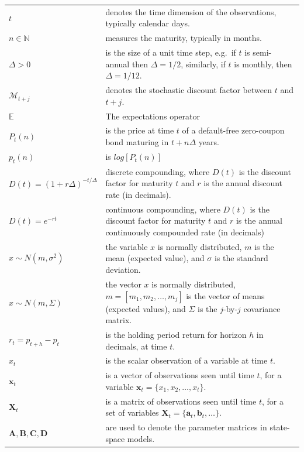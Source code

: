 \documentclass[
  letterpaper,
  DIV=11,
  numbers=noendperiod]{scrreprt}
\newcounter{none} %
\begin{document}
{\def\LTcaptype{none} %
\begin{longtable}[]{@{}ll@{}}
\toprule\noalign{}
\endhead
\bottomrule\noalign{}
\endlastfoot
\(t\) & denotes the time dimension of the observations, typically
calendar days. \\
\(n\in \mathbb{N}\) & measures the maturity, typically in months. \\
\(\Delta>0\) & is the size of a unit time step, e.g.~if \(t\) is
semi-annual then \(\Delta=1/2\), similarly, if \(t\) is monthly, then
\(\Delta=1/12\). \\
\(\mathcal{M}_{t+j}\) & denotes the stochastic discount factor between
\(t\) and \(t+j\). \\
\(\mathbb{E}\) & The expectations operator \\
\(P_t(n)\) & is the price at time \(t\) of a default-free zero-coupon
bond maturing in \(t+n\Delta\) years. \\
\(p_t(n)\) & is \(log\left[P_t(n)\right]\) \\
\(D(t) = (1 + r\Delta)^{-t/\Delta}\) & discrete compounding, where
\(D(t)\) is the discount factor for maturity \(t\) and \(r\) is the
annual discount rate (in decimals). \\
\(D(t) = e^{-rt}\) & continuous compounding, where \(D(t)\) is the
discount factor for maturity \(t\) and \(r\) is the annual continuously
compounded rate (in decimals) \\
\(x \sim N(m, \sigma^2)\) & the variable \(x\) is normally distributed,
\(m\) is the mean (expected value), and \(\sigma\) is the standard
deviation. \\
\(x \sim N(m, \Sigma)\) & the vector \(x\) is normally distributed,
\(m=[m_1, m_2, \ldots, m_j]\) is the vector of means (expected values),
and \(\Sigma\) is the \(j\)-by-\(j\) covariance matrix. \\
\(r_t=p_{t+h}-p_{t}\) & is the holding period return for horizon \(h\)
in decimals, at time \(t\). \\
\(x_t\) & is the scalar observation of a variable at time \(t\). \\
\(\mathbf{x}_t\) & is a vector of observations seen until time \(t\),
for a variable \(\mathbf{x}_t=\{x_1,x_2,\ldots,x_t \}\). \\
\(\mathbf{X}_t\) & is a matrix of observations seen until time \(t\),
for a set of variables
\(\mathbf{X}_t=\{\mathbf{a}_t,\mathbf{b}_t,\ldots \}\). \\
\(\mathbf{A},\mathbf{B},\mathbf{C},\mathbf{D}\) & are used to denote the
parameter matrices in state-space models. \\
\end{longtable}
}
\end{document}

